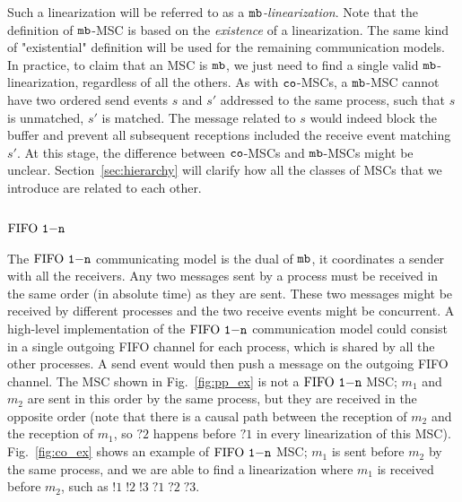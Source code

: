 Such a linearization will be referred to as a \emph{$\mathtt{mb}$-linearization}. Note that the definition of $\mathtt{mb}$-MSC is based on the \emph{existence} of a linearization. The same kind of "existential" definition will be used for the remaining communication models. In practice, to claim that an MSC is $\mathtt{mb}$, we just need to find a single valid $\mathtt{mb}$-linearization, regardless of all the others. As with $\mathtt{co}$-MSCs, a $\mathtt{mb}$-MSC cannot have two ordered send events $s$ and $s'$ addressed to the same process, such that $s$ is unmatched, $s'$ is matched. The message related to $s$ would indeed block the buffer and prevent all subsequent receptions included the receive event matching $s'$. 
%
%
At this stage, the difference between $\mathtt{co}$-MSCs and $\mathtt{mb}$-MSCs might be unclear. Section~\ref{sec:hierarchy} will clarify how all the classes of MSCs that we introduce are related to each other.


\subsection{ $\text{FIFO } \mathtt{1\mathsf{-}n}$}
The $\text{FIFO } \mathtt{1\mathsf{-}n}$ communicating model is the dual of $\mathtt{mb}$, it coordinates a sender with all the receivers. Any two messages sent by a process  must be received in the same order (in absolute time) as they are sent. These two messages might be received by different processes and the two receive events might be concurrent.
A high-level implementation of the $\text{FIFO } \mathtt{1\mathsf{-}n}$ communication model could consist in a single outgoing FIFO channel for each process, which is shared by all the other processes. A send event would then push a message on the outgoing FIFO channel.
The MSC shown in Fig.~\ref{fig:pp_ex} is not a $\text{FIFO } \mathtt{1\mathsf{-}n}$ MSC; $m_1$ and $m_2$ are sent in this order by the same process, but they are received in the opposite order (note that there is a causal path between the reception of $m_2$ and the reception of $m_1$, so $?2$ happens before $?1$ in every linearization of this MSC). Fig.~\ref{fig:co_ex} shows an example of $\text{FIFO } \mathtt{1\mathsf{-}n}$ MSC; $m_1$ is sent before $m_2$ by the same process, and we are able to find a linearization where $m_1$ is received before $m_2$, such as $!1\;!2\;!3\;?1\;?2\;?3$. 

